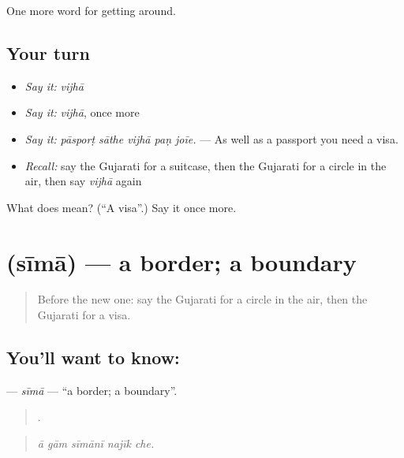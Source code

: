 \begin{grammarlens}[title={What you've built}]
One more word for getting around.
\end{grammarlens}

\subsection*{Your turn}
\begin{itemize}
\raggedright
  \item \emph{Say it:} \emph{vijhā}
  \item \emph{Say it:} \emph{vijhā}, once more
  \item \emph{Say it:} \emph{pāsporṭ sāthe vijhā paṇ joīe.} — As well as a passport you need a visa.
  \item \emph{Recall:} say the Gujarati for a suitcase, then the Gujarati for a circle in the air, then say \emph{vijhā} again
\end{itemize}

\begin{tcolorbox}[breakable,colback=teal!4,colframe=teal!35!black,title={Before you move on}]
What does  mean? (\textquotedblleft{}A visa\textquotedblright{}.) Say it once more.
\end{tcolorbox}
\section[\texorpdfstring{\gu{સીમા} (sīmā)}{સીમા (sīmā)}]{ (sīmā) — a border; a boundary}

\label{lesson:GU-C406-sima}



\begin{quote}
Before the new one: say the Gujarati for a circle in the air, then the Gujarati for a visa.
\end{quote}

\subsection*{You'll want to know: }
\textbf{} — \emph{sīmā} — \textquotedblleft{}a border; a boundary\textquotedblright{}.

\begin{quote}
    .
\end{quote}

\begin{quote}
\emph{ā gām sīmānī najīk che.}
\end{quote}

